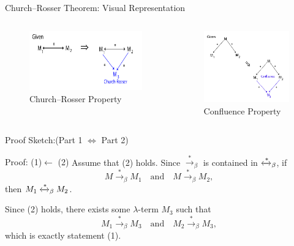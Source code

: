 \documentclass{beamer}
\begin{document}
\begin{frame}{Church–Rosser Theorem: Visual Representation}
  \begin{columns}
    \begin{figure}
      \includegraphics[width=\textwidth]{images/Church-Rosser.png}
      \caption{Church–Rosser Property}
    \end{figure}
    \begin{figure}
      \includegraphics[width=\textwidth]{images/Confluence.png}
      \caption{Confluence Property}
    \end{figure}
  \end{columns}
\end{frame}
\begin{frame}{Proof Sketch:(Part 1 $\Leftrightarrow$ Part 2)}
  \begin{block}{Proof: (1)$\leftarrow$ (2)}   
    Assume that (2) holds. Since $\xrightarrow{*}_\beta$ is contained in $\xleftrightarrow{*}_\beta$, if 
    \[
    M \xrightarrow{*}_\beta M_1 \quad \text{and} \quad M \xrightarrow{*}_\beta M_2,
    \]
    then $M_1 \xleftrightarrow{*}_\beta M_2$.

    \pause
    Since (2) holds, there exists some $\lambda$-term $M_3$ such that 
    \[
    M_1 \xrightarrow{*}_\beta M_3 \quad \text{and} \quad M_2 \xrightarrow{*}_\beta M_3,
    \]
    which is exactly statement (1).
  \end{block}
\end{frame}
\end{document}
